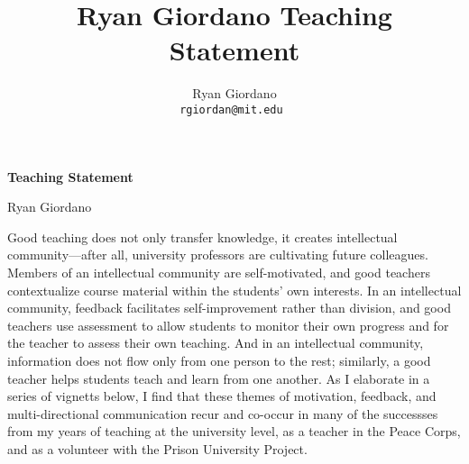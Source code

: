 

\usepackage{enumitem}

\usepackage{geometry}
\geometry{top=0.9in}
\geometry{left=1.4in}
\geometry{right=1.4in}


\title{Ryan Giordano Teaching Statement}

\author{
  Ryan Giordano \\ \texttt{rgiordan@mit.edu }
}




\begin{minipage}[t]{0.5\textwidth}
\hspace{-2em} %
{\bf \LARGE Teaching Statement}\\
\end{minipage}
\begin{minipage}[t]{0.5\textwidth}
        \hspace{8em} %
        {\LARGE Ryan Giordano}
\end{minipage}

Good teaching does not only transfer knowledge, it creates intellectual
community---after all, university professors are cultivating future colleagues.
Members of an intellectual community are self-motivated, and good teachers
contextualize course material within the students' own interests. In an
intellectual community, feedback facilitates self-improvement rather than
division, and good teachers use assessment to allow students to monitor their
own progress and for the teacher to assess their own teaching.  And in an
intellectual community, information does not flow only from one person to the
rest; similarly, a good teacher helps students teach and learn from one another.
As I elaborate in a series of vignetts below, I find that these themes of
motivation, feedback, and multi-directional communication recur and co-occur in
many of the successses from my years of teaching at the university level, as a
teacher in the Peace Corps, and as a volunteer with the Prison University
Project.

